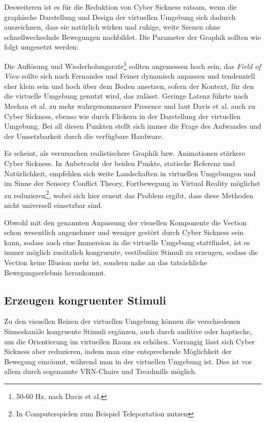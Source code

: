 Desweiteren ist es f\"ur die Reduktion von Cyber Sickness ratsam, wenn die graphische Darstellung und Design der virtuellen Umgebung sich dadurch auszeichnen, dass sie nat\"urlich wirken und ruhige, weite Szenen ohne schnellwechselnde Bewegungen nachbildet. Die Parameter der Graphik sollten wie folgt umgesetzt werden:

Die Aufl\"osung und Wiederholungsrate\footnote{50-60 Hz, nach Davis et al.\cite{Davis:2014:Factors}} sollten angemessen hoch sein\cite{kirollos:2019:refresh}, das \textit{Field of View} sollte sich nach Fernandes und Feiner\cite{Fenandes:2016:FOV} dynamisch anpassen und tendenziell eher klein sein und hoch \"uber dem Boden ansetzen, sofern der Kontext, f\"ur den die virtuelle Umgebung genutzt wird, das zul\"asst. Geringe Latenz f\"uhrte nach Meehan et al.\cite{Meehan:2003:latency} zu mehr wahrgenommener Presence und laut Davis et al.\cite{Davis:2014:Factors} auch zu Cyber Sickness, ebenso wie durch Flickern in der Darstellung der virtuellen Umgebung.
Bei all diesen Punkten stellt sich immer die Frage des Aufwandes und der Umsetzbarkeit durch die verf\"ugbare Hardware.

Es scheint, als verursachen realistischere Graphik bzw. Animationen st\"arkere Cyber Sickness\cite{Pouke:2018:Realism}.
In Anbetracht der beiden Punkte, statische Referenz und Nat\"urlichkeit, empfehlen sich weite Landschaften in virtuellen Umgebungen und im Sinne der Sensory Conflict Theory, Fortbewegung in Virtual Reality m\"oglichst zu reduzieren\footnote{In Computerspielen zum Beispiel Teleportation nutzen}, wobei sich hier erneut das Problem ergibt, dass diese Methoden nicht universell einsetzbar sind.

Obwohl mit den genannten Anpassung der visuellen Komponente die Vection schon wesentlich angenehmer und weniger gest\"ort durch Cyber Sickness sein kann, sodass auch eine Immersion in die virtuelle Umgebung stattfindet, ist es immer m\"oglich zus\"atzlich kongruente, vestibul\"are Stimuli zu erzeugen, sodass die Vection keine Illusion mehr ist, sondern nahe an das tats\"achliche Bewegungserlebnis herankommt.

\subsection{Erzeugen kongruenter Stimuli}\label{Vestibular}

Zu den visuellen Reizen der virtuellen Umgebung k\"onnen die verschiedenen Sinneskan\"ale kongruente Stimuli erg\"anzen, auch durch auditive oder haptische, um die Orientierung im virtuellen Raum zu erh\"ohen. Vorrangig l\"asst sich Cyber Sickness aber reduzieren, indem man eine entsprechende M\"oglichkeit der Bewegung einr\"aumt, w\"ahrend man in der virtuellen Umgebung ist. Dies ist vor allem durch sogenannte VRN-Chairs und Treadmills m\"oglich.

